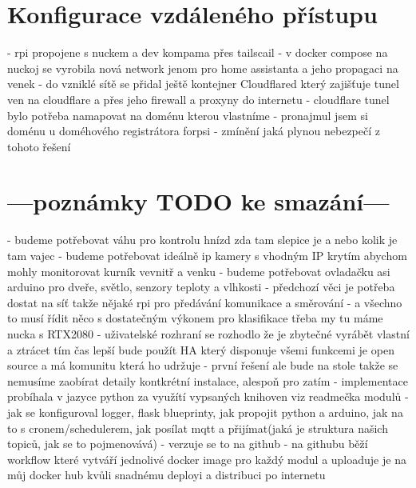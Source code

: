 \newpage


\section{Konfigurace vzdáleného přístupu}\label{sec:konfigurace-vzdaleneho-pristupu}
- rpi propojene s nuckem a dev kompama přes tailscail\newline
- v docker compose na nuckoj se vyrobila nová network jenom pro home assistanta a jeho propagaci na venek\newline
- do vzniklé sítě se přidal ještě kontejner Cloudflared který zajišťuje tunel ven na cloudflare a přes jeho firewall a proxyny do internetu\newline
- cloudflare tunel bylo potřeba namapovat na doménu kterou vlastníme\newline
- pronajmul jsem si doménu u doméhového registrátora forpsi\newline
- zmínění jaká plynou nebezpečí z tohoto řešení

\newpage

\section*{---poznámky TODO ke smazání---}\label{sec:---poznamky-todo-ke-smazani---}
- budeme potřebovat váhu pro kontrolu hnízd zda tam slepice je a nebo kolik je tam vajec\newline
- budeme potřebovat ideálně ip kamery s vhodným IP krytím abychom mohly monitorovat kurník vevnitř a venku\newline
- budeme potřebovat ovladačku asi arduino pro dveře, světlo, senzory teploty a vlhkosti\newline
- předchozí věci je potřeba dostat na síť takže nějaké rpi pro předávání komunikace a směrování\newline
- a všechno to musí řídit něco s dostatečným výkonem pro klasifikace třeba my tu máme nucka s RTX2080\newline
- uživatelské rozhraní se rozhodlo že je zbytečné vyrábět vlastní a ztrácet tím čas lepší bude použít HA který disponuje všemi funkcemi je open source a má komunitu která ho udržuje
- první řešení ale bude na stole takže se nemusíme zaobírat detaily kontkrétní instalace, alespoň pro zatím
- implementace probíhala v jazyce python za využítí vypsaných knihoven viz readmečka modulů\newline
- jak se konfiguroval logger, flask blueprinty, jak propojit python a arduino, jak na to s cronem/schedulerem, jak posílat mqtt a přijímat(jaká je struktura našich topiců, jak se to pojmenovává)
- verzuje se to na github
- na githubu běží workflow které vytváří jednolivé docker image pro každý modul a uploaduje je na můj docker hub kvůli snadnému deployi a distribuci po internetu